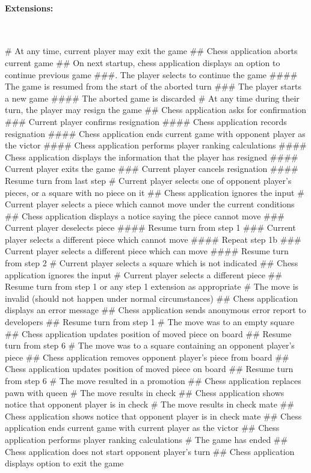 \documentclass{article}
\begin{document}
\paragraph{Extensions:}\mbox{}\\
\begin{easylist}[enumerate]
# At any time, current player may exit the game
## Chess application aborts current game
## On next startup, chess application displays an option to continue previous game
###. The player selects to continue the game
#### The game is resumed from the start of the aborted turn
### The player starts a new game
#### The aborted game is discarded
# At any time during their turn, the player may resign the game
## Chess application asks for confirmation
### Current player confirms resignation
#### Chess application records resignation
#### Chess application ends current game with opponent player as the victor
#### Chess application performs player ranking calculations
#### Chess application displays the information that the player has resigned
#### Current player exits the game
### Current player cancels resignation
#### Resume turn from last step
# Current player selects one of opponent player's pieces, or a square with no piece on it
## Chess application ignores the input
# Current player selects a piece which cannot move under the current conditions
## Chess application displays a notice saying the piece cannot move
### Current player deselects piece
#### Resume turn from step 1
### Current player selects a different piece which cannot move
#### Repeat step 1b
### Current player selects a different piece which can move
#### Resume turn from step 2
# Current player selects a square which is not indicated
## Chess application ignores the input
# Current player selects a different piece
## Resume turn from step 1 or any step 1 extension as appropriate
# The move is invalid (should not happen under normal circumstances)
## Chess application displays an error message
## Chess application sends anonymous error report to developers
## Resume turn from step 1
# The move was to an empty square
## Chess application updates position of moved piece on board
## Resume turn from step 6
# The move was to a square containing an opponent player's piece
## Chess application removes opponent player's piece from board
## Chess application updates position of moved piece on board
## Resume turn from step 6
# The move resulted in a promotion
## Chess application replaces pawn with queen
# The move results in check
## Chess application shows notice that opponent player is in check
# The move results in check mate
## Chess application shows notice that opponent player is in check mate
## Chess application ends current game with current player as the victor
## Chess application performs player ranking calculations
# The game has ended
## Chess application does not start opponent player's turn
## Chess application displays option to exit the game
\end{easylist}
\end{document}
